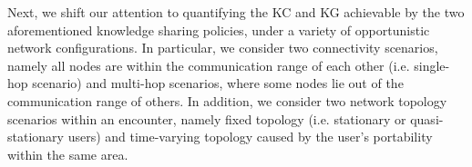\documentclass[conference]{IEEEtran}
\theoremstyle{definition}
\begin{document}
Next, we shift our attention to quantifying the KC and KG achievable by the two aforementioned knowledge sharing policies, under a variety of opportunistic network configurations. In particular, we consider two connectivity scenarios, namely all nodes are within the communication range of each other (i.e. single-hop scenario) and multi-hop scenarios, where some nodes lie out of the communication range of others. In addition, we consider two network topology scenarios within an encounter, namely fixed topology (i.e. stationary or quasi-stationary users) and time-varying topology caused by the user's portability within the same area. 

%
\vspace{-0.3 cm}
\end{document}
